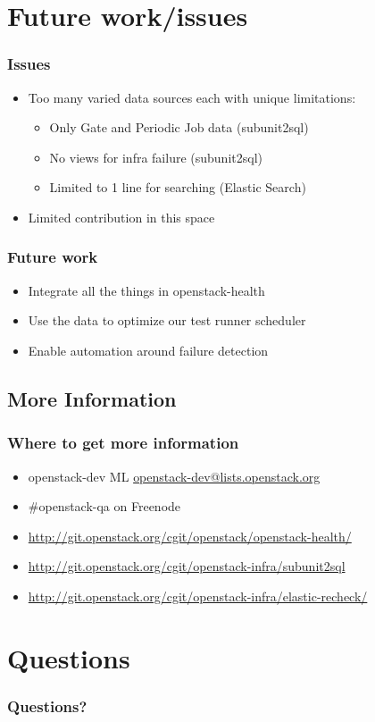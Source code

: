 \documentclass[aspectratio=169,11pt,hyperref={colorlinks=true}]{beamer}
\begin{document}
\section{Future work/issues}

\begin{frame}
    \frametitle{Issues}
    \begin{itemize}
        \item Too many varied data sources each with unique limitations:
        \begin{itemize}
            \item Only Gate and Periodic Job data (subunit2sql)
            \item No views for infra failure (subunit2sql)
            \item Limited to 1 line for searching (Elastic Search)
        \end{itemize}
        \item Limited contribution in this space
    \end{itemize}
\end{frame}

\begin{frame}
    \frametitle{Future work}
    \begin{itemize}
        \item Integrate all the things in openstack-health
        \item Use the data to optimize our test runner scheduler
        \item Enable automation around failure detection
    \end{itemize}
\end{frame}

\subsection{More Information}
\begin{frame}
\frametitle{Where to get more information}
    \begin{itemize}
        \item openstack-dev ML\: \href{mailto:openstack-dev@lists.openstack.org}{openstack-dev@lists.openstack.org}
        \item \#openstack-qa on Freenode
        \item \href{http://git.openstack.org/cgit/openstack/openstack-health/}{http://git.openstack.org/cgit/openstack/openstack-health/}
        \item \href{http://git.openstack.org/cgit/openstack-infra/subunit2sql}{http://git.openstack.org/cgit/openstack-infra/subunit2sql}
        \item \href{http://git.openstack.org/cgit/openstack-infra/elastic-recheck/}{http://git.openstack.org/cgit/openstack-infra/elastic-recheck/}
    \end{itemize}
\end{frame}

\section{Questions}
\begin{frame}
\frametitle{Questions?}
\end{frame}
\end{document}
